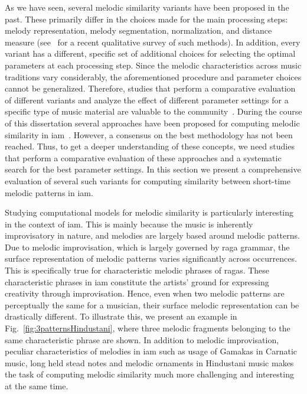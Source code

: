 As we have seen, several melodic similarity variants have been proposed in the past. These primarily differ in the choices made for the main processing steps: melody representation, melody segmentation, normalization, and distance measure (see~\cite{kotsifakos2012survey} for a recent qualitative survey of such methods). In addition, every variant has a different, specific set of additional choices for selecting the optimal parameters at each processing step. Since the melodic characteristics across music traditions vary considerably, the aforementioned procedure and parameter choices cannot be generalized. Therefore, studies that perform a comparative evaluation of different variants and analyze the effect of different parameter settings for a specific type of music material are valuable to the community~\citep{RBDannenberg2007QBH,Rao2014,salamon2013tonal,XavierSerra2011}. During the course of this dissertation several approaches have been proposed for computing melodic similarity in \gls{iam}~\citep{Rao2014, Ishwar2013, Ross2012b, Ross2012}. However, a consensus on the best methodology has not been reached. Thus, to get a deeper understanding of these concepts, we need studies that perform a comparative evaluation of these approaches and a systematic search for the best parameter settings. In this section we present a comprehensive evaluation of several such variants for computing similarity between short-time melodic patterns in \gls{iam}.

Studying computational models for melodic similarity is particularly interesting in the context of \gls{iam}. This is mainly because the music is inherently improvisatory in nature, and melodies are largely based around melodic patterns. Due to melodic improvisation, which is largely governed by \gls{raga} grammar, the surface representation of melodic patterns varies significantly across occurrences. This is specifically true for characteristic melodic phrases of \glspl{raga}. These characteristic phrases in \gls{iam} constitute the artists' ground for expressing creativity through improvisation. Hence, even when two melodic patterns are perceptually the same for a musician, their surface melodic representation can be drastically different. To illustrate this, we present an example in Fig.~\ref{fig:3patternsHindustani}, where three melodic fragments belonging to the same characteristic phrase are shown. In addition to melodic improvisation, peculiar characteristics of melodies in \gls{iam} such as usage of Gamakas in Carnatic music, long held stead notes and melodic ornaments in Hindustani music makes the task of computing melodic similarity much more challenging and interesting at the same time. 

